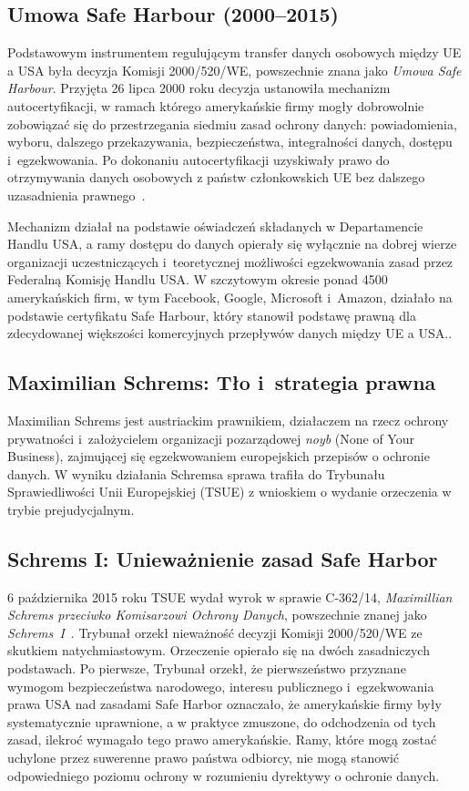 \subsection{Umowa Safe Harbour (2000–2015)}

Podstawowym instrumentem regulującym transfer danych osobowych między UE a USA była decyzja Komisji 2000/520/WE, powszechnie znana jako \textit{Umowa Safe Harbour}. Przyjęta 26 lipca 2000 roku decyzja ustanowiła mechanizm autocertyfikacji, w ramach którego amerykańskie firmy mogły dobrowolnie zobowiązać się do przestrzegania siedmiu zasad ochrony danych: powiadomienia, wyboru, dalszego przekazywania, bezpieczeństwa, integralności danych, dostępu i~egzekwowania. Po dokonaniu autocertyfikacji uzyskiwały prawo do otrzymywania danych osobowych z państw członkowskich UE bez dalszego uzasadnienia prawnego~\autocite{EuropeanCommission2000SafeHarbour}.

Mechanizm działał na podstawie oświadczeń składanych w Departamencie Handlu USA, a ramy dostępu do danych opierały się wyłącznie na dobrej wierze organizacji uczestniczących i~teoretycznej możliwości egzekwowania zasad przez Federalną Komisję Handlu USA. W szczytowym okresie ponad 4500 amerykańskich firm, w tym Facebook, Google, Microsoft i~Amazon, działało na podstawie certyfikatu Safe Harbour, który stanowił podstawę prawną dla zdecydowanej większości komercyjnych przepływów danych między UE a USA.\autocite{EuropeanCommission2000SafeHarbour}.

\subsection{Maximilian Schrems: Tło i~strategia prawna}

Maximilian Schrems jest austriackim prawnikiem, działaczem na rzecz ochrony prywatności i~założycielem organizacji pozarządowej \textit{noyb} (None of Your Business), zajmującej się egzekwowaniem europejskich przepisów o ochronie danych. W wyniku działania Schremsa sprawa trafiła do Trybunału Sprawiedliwości Unii Europejskiej (TSUE) z wnioskiem o wydanie orzeczenia w trybie prejudycjalnym.

\subsection{Schrems I: Unieważnienie zasad Safe Harbor}

6 października 2015 roku TSUE wydał wyrok w sprawie C-362/14, \textit{Maximillian Schrems przeciwko Komisarzowi Ochrony Danych}, powszechnie znanej jako \textit{Schrems~I}~\autocite{CJEU2015SchremsI}. Trybunał orzekł nieważność decyzji Komisji 2000/520/WE ze skutkiem natychmiastowym. Orzeczenie opierało się na dwóch
zasadniczych podstawach. 
Po pierwsze, Trybunał orzekł, że pierwszeństwo przyznane wymogom bezpieczeństwa narodowego, interesu publicznego i~egzekwowania prawa USA nad zasadami Safe Harbor oznaczało, że amerykańskie firmy były systematycznie uprawnione, a w praktyce zmuszone, do odchodzenia od tych zasad, ilekroć wymagało tego prawo amerykańskie. Ramy, które mogą zostać uchylone przez suwerenne prawo państwa odbiorcy, nie mogą stanowić odpowiedniego poziomu ochrony w rozumieniu dyrektywy o ochronie danych.


